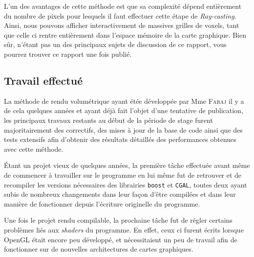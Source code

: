 {{{			\par

			L'un des avantages de cette méthode est que sa complexité dépend entièrement du nombre de pixels pour lesquels il faut effectuer cette étape de \textit{Ray-casting}. Ainsi, nous pouvons afficher interactivement de massives grilles de voxels, tant que celle ci rentre entièrement dans l'espace mémoire de la carte graphique. Bien sûr, n'étant pas un des principaux sujets de discussion de ce rapport, vous pourrez trouver ce rapport une fois publié. \par
		}

		\subsection{Travail effectué}
		{
			La méthode de rendu volumétrique ayant étée développée par Mme \textsc{Faraj} il y a de cela quelques années et ayant déjà fait l'objet d'une tentative de publication, les principaux travaux restants au début de la période de stage furent majoritairement des correctifs, des mises à jour de la base de code ainsi que des tests extensifs afin d'obtenir des résultats détaillés des performances obtenues avec cette méthode.\par

			\par

			Étant un projet vieux de quelques années, la première tâche effectuée avant même de commencer à travailler sur le programme en lui même fut de retrouver et de recompiler les versions nécessaires des librairies \texttt{boost} et \texttt{CGAL}, toutes deux ayant subis de nombreux changements dans leur façon d'être compilées et dans leur manière de fonctionner depuis l'écriture originelle du programme. \par

			Une fois le projet rendu compilable, la prochaine tâche fut de régler certains problèmes liés aux \textit{shaders} du programme. En effet, ceux ci furent écrits lorsque OpenGL était encore peu développé, et nécessitaient un peu de travail afin de fonctionner sur de nouvelles architectures de cartes graphiques.

}}}

